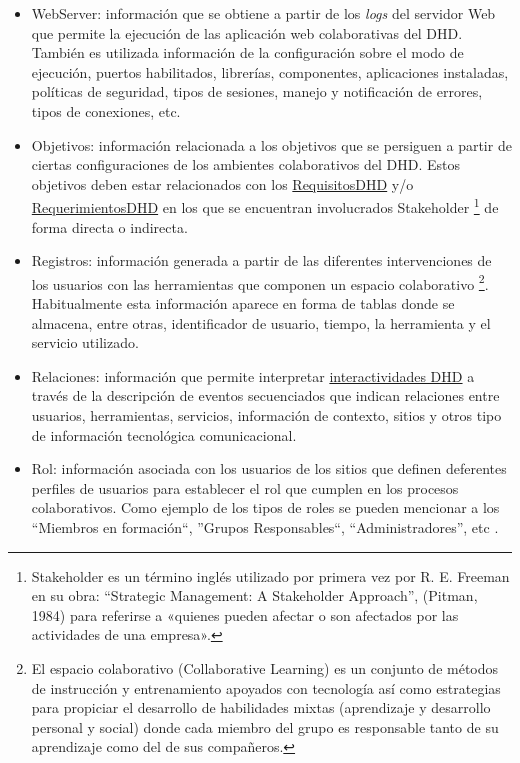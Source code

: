 \begin{itemize}
 \item WebServer: información que se obtiene a partir de los \textit{logs}
del
servidor Web que permite la ejecución de las aplicación web colaborativas del
DHD. También es utilizada información de la configuración  sobre el modo
de ejecución, puertos habilitados, librerías, componentes, aplicaciones
instaladas, políticas de seguridad, tipos de sesiones, manejo y notificación
de errores, tipos de conexiones, etc.

\item Objetivos: información relacionada a los objetivos que se persiguen a
partir de ciertas configuraciones de los ambientes colaborativos del DHD. Estos
objetivos deben estar relacionados con los
\hyperref[requisitosdhd]{RequisitosDHD}
y/o \hyperref[requerimientosdhd]{RequerimientosDHD}
en los que se encuentran involucrados Stakeholder \footnote{Stakeholder es un
término inglés utilizado por primera vez por R. E. Freeman en su obra:
“Strategic Management: A Stakeholder Approach”, (Pitman, 1984) para referirse a
«quienes pueden afectar o son afectados por las actividades de una empresa».} de
forma directa o indirecta. 

\item Registros: información generada a partir de las diferentes
intervenciones de los usuarios con las herramientas que componen un espacio
colaborativo \footnote{El espacio colaborativo (Collaborative Learning) es
un conjunto de métodos de instrucción y entrenamiento apoyados con tecnología
así como estrategias para propiciar el desarrollo de habilidades mixtas
(aprendizaje y desarrollo personal y social) donde cada miembro del grupo es
responsable tanto de su aprendizaje como del de sus compañeros.}.
Habitualmente esta información aparece en forma de tablas donde se
almacena, entre otras, identificador de usuario, tiempo, la herramienta y
el servicio utilizado.

\item Relaciones: información que permite interpretar
\hyperref[interactividadDHD]{interactividades DHD} a través de la
descripción de eventos secuenciados que indican relaciones entre usuarios,
herramientas, servicios, información de contexto, sitios y otros tipo de
información tecnológica comunicacional.

\item Rol: información asociada con los usuarios de los sitios que definen
deferentes perfiles de usuarios para establecer el rol que cumplen en los procesos
colaborativos. Como ejemplo de los tipos de roles se pueden mencionar a los
``Miembros en formación``, ''Grupos Responsables``, ``Administradores'', etc
\cite{libro}.


\end{itemize}
